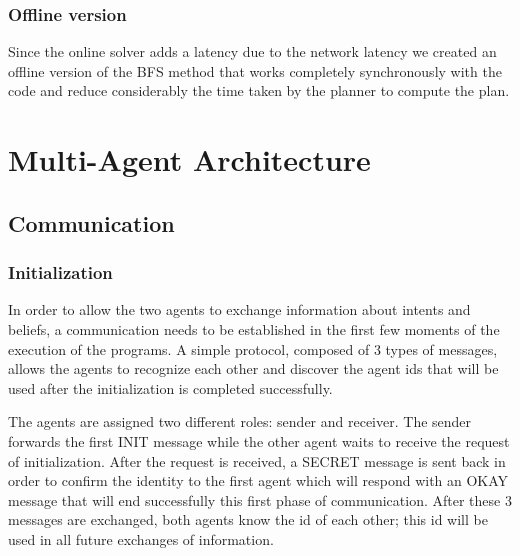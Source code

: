 \documentclass[a4paper, 11pt]{article}
\begin{document}
\subsubsection{Offline version}

Since the online solver adds a latency due to the network latency we created an offline version of the BFS method that works completely synchronously with the code and reduce considerably the time taken by the planner to compute the plan.

\pagebreak

\section{Multi-Agent Architecture}


\subsection{Communication}
\subsubsection{Initialization}
In order to allow the two agents to exchange information about intents and beliefs, a communication needs to be established in the first few moments of the execution of the programs. A simple protocol, composed of 3 types of messages, allows the agents to recognize each other and discover the agent ids that will be used after the initialization is completed successfully.

The agents are assigned two different roles: sender and receiver. The sender forwards the first INIT message while the other agent waits to receive the request of initialization. After the request is received, a SECRET message is sent back in order to confirm the identity to the first agent which will respond with an OKAY message that will end successfully this first phase of communication. After these 3 messages are exchanged, both agents know the id of each other; this id will be used in all future exchanges of information.
\end{document}
